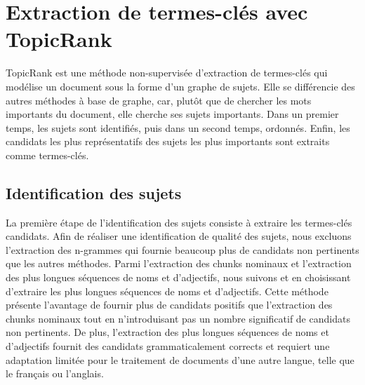 \section{Extraction de termes-clés avec TopicRank}
\label{sec:extraction_de_termes_cles_avec_topicrank}
  TopicRank est une méthode non-supervisée d'extraction de termes-clés qui
  modélise un document sous la forme d'un graphe de sujets.
  Elle se différencie des autres méthodes à base de graphe, car, plutôt que de
  chercher les mots importants du document, elle cherche ses sujets importants.
  Dans un premier temps, les sujets sont identifiés, puis dans un second temps,
  ordonnés. Enfin, les candidats les plus représentatifs des sujets les plus
  importants sont extraits comme termes-clés.

  \subsection{Identification des sujets}
  \label{subsec:identification_des_sujets}
    La première étape de l'identification des sujets consiste à extraire les
    termes-clés candidats.
    Afin de réaliser une identification de qualité des sujets, nous excluons
    l'extraction des n-grammes qui fournie beaucoup plus de candidats non
    pertinents que les autres méthodes. Parmi l'extraction des chunks nominaux
    et l'extraction des plus longues séquences de noms et d'adjectifs, nous
    suivons  et  en
    choisissant d'extraire les plus longues séquences de noms et d'adjectifs.
    Cette méthode présente l'avantage de fournir plus de candidats positifs que
    l'extraction des chunks nominaux tout en n'introduisant pas un nombre
    significatif de candidats non pertinents. De plus, l'extraction des plus
    longues séquences de noms et d'adjectifs fournit des candidats
    grammaticalement corrects et requiert une adaptation limitée pour le
    traitement de documents d'une autre langue, telle que le français ou
    l'anglais.

